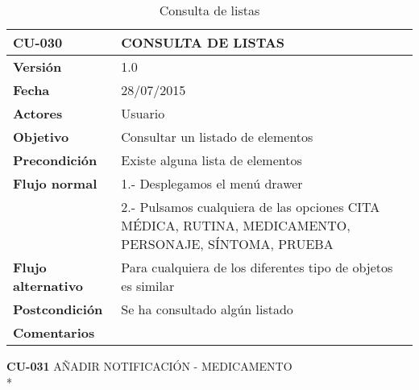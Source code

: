 \documentclass[../pfc.tex]{subfiles}
\begin{document}
	\begin{table}[H]
		\centering
		\begin{tabular}[t]{|p{3cm}|p{9.5cm}|}
			\hline \textbf{CU-030} & \textbf{CONSULTA DE LISTAS} \\*
			\hline\hline \textbf{Versión} & 1.0 \\*
			\hline\hline \textbf{Fecha} & 28/07/2015 \\*
			\hline\textbf{Actores} 	& Usuario\\*
			\hline \textbf{Objetivo} & Consultar un listado de elementos\\* 			
			\hline \textbf{Precondición} & Existe alguna lista de elementos\\* 
			\hline \textbf{Flujo normal} & 1.- Desplegamos el menú drawer \\* 
			& 2.- Pulsamos cualquiera de las opciones CITA MÉDICA, RUTINA, MEDICAMENTO, PERSONAJE, SÍNTOMA, PRUEBA\\*	
			\hline \textbf{Flujo alternativo} & Para cualquiera de los diferentes tipo de objetos es similar \\* 
			\hline \textbf{Postcondición} & Se ha consultado algún listado\\* 
			\hline \textbf{Comentarios}   & \\*
			\hline
		\end{tabular}
		\caption{Consulta de listas}
		\label{tabla:caso030}
	\end{table}

	\textbf{CU-031}	AÑADIR NOTIFICACIÓN - MEDICAMENTO\\*
\end{document}
